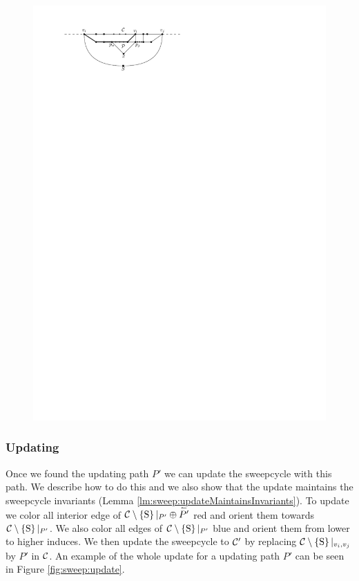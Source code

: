     \begin{figure}[b]
      \centering
      \includegraphics[scale=1]{unifiedAlgo/img/sweep/free2chord}
      \caption{}
      \label{fig:sweep:free2chord}
    \end{figure}

  \subsubsection{Updating}
    \label{sss:sweep:update}
    Once we found the updating path $P'$ we can update the sweepcycle with this path.
    We describe how to do this and we also show that the update maintains the sweepcycle invariants (Lemma \ref{lm:sweep:updateMaintainsInvariants}).
    To update we color all interior edge of $\mathcal{C} \setminus \left\lbrace {\mathrm{S}} \right\rbrace|_{P'} \oplus \accentset{\leftharpoonup}{P'}$ red and orient them towards $\mathcal{C} \setminus \left\lbrace {\mathrm{S}} \right\rbrace|_{P'}$.
    We also color all edges of $\mathcal{C} \setminus \left\lbrace {\mathrm{S}} \right\rbrace|_{P'}$  blue and orient them from lower to higher induces.
    We then update the sweepcycle to $\mathcal{C}'$ by replacing $\mathcal{C} \setminus \left\lbrace {\mathrm{S}} \right\rbrace|_{v_i,v_j}$ by $P'$ in $\mathcal{C}$.
    An example of the whole update for a updating path $P'$ can be seen in Figure \ref{fig:sweep:update}.


